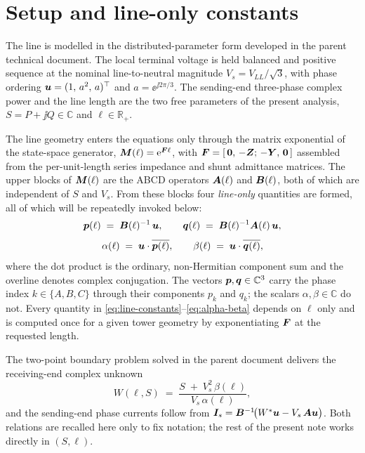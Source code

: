 
\section{Setup and line-only constants}
\label{sec:setup}

The line is modelled in the distributed-parameter form developed in the
parent technical document. The local terminal voltage is held balanced
and positive sequence at the nominal line-to-neutral magnitude
$V_{s} = V_{LL}/\sqrt{3}$, with phase ordering
$\bm{u} = (1,\,a^{2},\,a)^{\top}$ and $a = \ee^{\jj 2\pi/3}$. The
sending-end three-phase complex power and the line length are the two
free parameters of the present analysis,
$S = P + \jj Q \in \mathbb{C}$ and
$\ell \in \mathbb{R}_{+}$.

The line geometry enters the equations only through the matrix
exponential of the state-space generator,
$\bm{M}(\ell) = \mathrm{e}^{\bm{F} \ell}$, with
$\bm{F} = [\,\bm{0},\,-\bm{Z};\,-\bm{Y},\,\bm{0}\,]$ assembled from the
per-unit-length series impedance and shunt admittance matrices. The
upper blocks of $\bm{M}(\ell)$ are the ABCD operators $\bm{A}(\ell)$ and
$\bm{B}(\ell)$, both of which are independent of $S$ and $V_{s}$. From
these blocks four \emph{line-only} quantities are formed, all of which
will be repeatedly invoked below:
%
\begin{equation}
\label{eq:line-constants}
\bm{p}(\ell) \;=\; \bm{B}(\ell)^{-1}\,\bm{u},
\qquad
\bm{q}(\ell) \;=\; \bm{B}(\ell)^{-1}\bm{A}(\ell)\,\bm{u},
\end{equation}
%
\begin{equation}
\label{eq:alpha-beta}
\alpha(\ell) \;=\; \bm{u} \cdot \overline{\bm{p}(\ell)},
\qquad
\beta(\ell)  \;=\; \bm{u} \cdot \overline{\bm{q}(\ell)},
\end{equation}
%
\noindent where the dot product is the ordinary, non-Hermitian component
sum and the overline denotes complex conjugation. The vectors
$\bm{p},\bm{q} \in \mathbb{C}^{3}$ carry the phase index $k \in \{A,B,C\}$
through their components $p_{k}$ and $q_{k}$; the scalars
$\alpha,\beta \in \mathbb{C}$ do not. Every quantity in
\eqref{eq:line-constants}--\eqref{eq:alpha-beta} depends on $\ell$ only
and is computed once for a given tower geometry by exponentiating
$\bm{F}$ at the requested length.

The two-point boundary problem solved in the parent document delivers
the receiving-end complex unknown
\begin{equation}
\label{eq:W-recall}
W(\ell, S)
\;=\;
\frac{S \;+\; V_{s}^{2}\,\beta(\ell)}{V_{s}\,\alpha(\ell)},
\end{equation}
\noindent and the sending-end phase currents follow from
$\bm{I}_{s} = \bm{B}^{-1}\!\bigl(W^{*}\bm{u} - V_{s}\,\bm{A}\bm{u}\bigr)$. Both
relations are recalled here only to fix notation; the rest of the
present note works directly in $(S,\ell)$.
